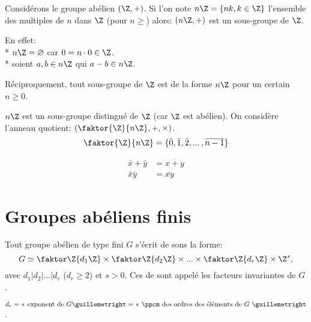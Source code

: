 Considérons le groupe abélien $(\Z, +)$. Si l'on note $n\Z=\{nk, k\in\Z\}$ l'ensemble des multiples de $n$ dans $\Z$ (pour $n\geq$) alors: $(n\Z,+)$ est un sous-groupe de $\Z$.

En effet: \\
* $n\Z=\varnothing$ car $0=n\cdot 0\in\Z$.\\
* soient $a,b\in n\Z$ qui $a-b\in n\Z$. 

Réciproquement, tout sous-groupe de $\Z$ est de la forme $n\Z$ pour un certain $n\geq 0$.

$n\Z$ est un sous-groupe distingué de $\Z$ (car $\Z$ est abélien). On considère l'anneau quotient: $(\faktor{\Z}{n\Z}, +, \times)$.
$$\faktor{\Z}{n\Z}=\{\bar 0,\bar 1, \bar 2, ...\,, \overline{n-1}\}$$

\begin{align}
	\bar x+\bar y &= \overline{x+y}\\
	\bar x \bar y &= \overline{xy}
\end{align}

\section{Groupes abéliens finis}

\begin{theorem}
	Tout groupe abélien de type fini $G$ s'écrit de sons la forme:
	$$G\simeq \faktor\Z{d_1\Z} \times \faktor\Z{d_2\Z} \times ... \times \faktor\Z{d_r\Z} \times \Z^s,$$
	avec $d_1|d_2|...|d_r$ ($d_r\geq 2$) et $s>0$. Ces de sont appelé les facteurs invariantes de $G$.
\end{theorem}
\begin{remark}
	$d_r = \text{« exponent de $G$} » = \text{« $\ppcm$ des ordres des éléments de $G$ »}$. 
\end{remark}

